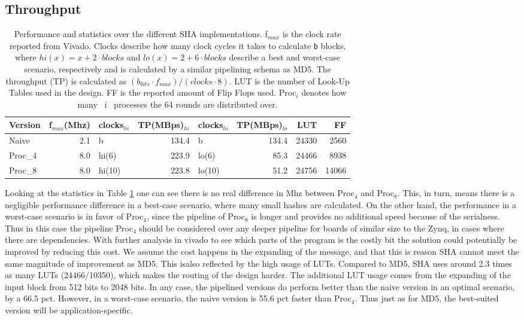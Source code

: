 \documentclass[a4paper, openany]{book}
\begin{document}
\subsection{Throughput}
\label{sec:orgb9b1064}
\begin{table}[!htb]
\centering
\captionsetup{width=.8\linewidth}
\begin{tabular}{l r l r l r r r}
\hline
Version & f$_{max}$(Mhz) & clocks$_{hi}$ & TP(MBps)$_{hi}$ &clocks$_{lo}$ & TP(MBps)$_{lo}$ & LUT & FF\\
\hline
Naive    & 2.1 & b & 134.4 & b & 134.4 & 24330 & 2560\\
Proc_{4} & 8.0 & hi(6) & 223.9 & lo(6) & 85.3 & 24466 & 8938\\
Proc_{8} & 8.0 & hi(10) & 223.8 & lo(10) & 51.2 & 24756 & 14066\\
\end{tabular}
\caption[SHA256: FPGA Versions]%
{Performance and statistics over the different SHA implementations. f$_{max}$ is the clock rate reported from Vivado. Clocks describe how many clock cycles it takes to calculate \texttt{b} blocks, where $hi(x) = x+2 \cdot blocks$ and $lo(x) = 2 + 6 \cdot blocks$ describe a best and worst-case scenario, respectively and is calculated by a similar pipelining schema as MD5. The throughput (TP) is calculated as \((b_{bits}\cdot f_{max})/(clocks \cdot 8)\). LUT is the number of Look-Up Tables used in the design. FF is the reported amount of Flip Flops used. Proc$_{i}$ denotes how many ~i~ processes the 64 rounds are distributed over.}
\label{tab:SHAversions}
\end{table}
Looking at the statistics in Table \ref{tab:SHAversions} one can see there is no real difference in Mhz between Proc\(_4\) and Proc\(_8\). This, in turn, means there is a negligible performance difference in a best-case scenario, where many small hashes are calculated. On the other hand, the performance in a worst-case scenario is in favor of Proc\(_4\), since the pipeline of Proc\(_8\) is longer and provides no additional speed because of the serialness. Thus in this case the pipeline Proc\(_4\) should be considered over any deeper pipeline for boards of similar size to the Zynq, in cases where there are dependencies. With further analysis in vivado to see which parts of the program is the costly bit the solution could potentially be improved by reducing this cost. We assume the cost happens in the expanding of the message, and that this is reason SHA cannot meet the same magnitude of improvement as MD5. This isalso reflected by the high usage of LUTs. Compared to MD5, SHA uses around 2.3 times as many LUTs (24466/10350), which makes the routing of the design harder. The additional LUT usage comes from the expanding of the input block from 512 bits to 2048 bits. In any case, the pipelined versions do perform better than the naive version in an optimal scenario, by a 66.5 pct. However, in a worst-case scenario, the naive version is 55.6 pct faster than Proc\(_4\). Thus just as for MD5, the best-suited version will be application-specific.
\end{document}
